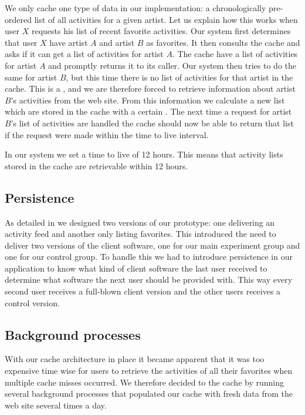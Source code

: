 We only cache one type of data in our implementation:
a chronologically pre-ordered list of all activities for a given artist.
Let us explain how this works
when user $X$ requests his list of recent favorite activities. Our system
first determines that user $X$ have artist $A$ and artist $B$ as
favorites. It then consults the cache and asks if it can get a list of
activities for artist $A$. The cache have a list of activities for artist $A$
and promptly returns it to its caller. Our system then tries to do the same
for artist $B$, but this time there is no list of activities for that artist
in the cache. This is a , and we are therefore forced to
retrieve information about artist $B$'s activities from the \urort{} web site.
From this information we calculate a new list which are stored in the cache
with a certain
. The next time a request for artist $B$'s list of
activities are handled the cache should now be able to return that list
if the request were made within the time to live interval.

In our system we set a time to live of 12 hours. This means that activity
lists stored in the cache are retrievable within 12 hours.

\subsection{Persistence}

As detailed in
we designed two versions of our prototype: one delivering an activity
feed and another only listing favorites. This introduced the need to deliver
two versions of the client software, one for our main experiment group and one
for our control group. To handle this we had to introduce persistence in our
application to know what kind of client software the last user received to
determine what software the next user should be provided with. This way every
second user receives a full-blown client version and the other users receives
a control version.

\subsection{Background processes}
\label{section:implementation.architecture.background.process}

With our cache architecture in place it became apparent that it was too
expensive time wise for users to retrieve the activities of all their
favorites when multiple cache misses occurred. We therefore decided to
 the cache by running several background processes that populated
our cache with fresh data from the \urort{} web site several times a day.


